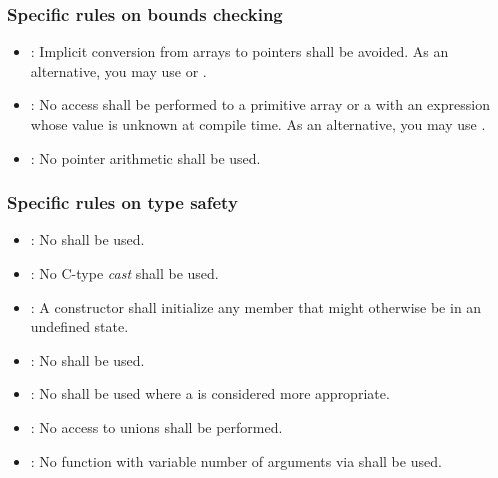 \subsubsection{Specific rules on bounds checking}

\begin{itemize}

\item {}:
Implicit conversion from arrays to pointers shall be avoided.
As an alternative, you may use
 or .

\item {}:
No access shall be performed to a primitive array or a 
with an expression whose value is unknown at compile time.
As an alternative, you may use 
.

\item {}:
No pointer arithmetic shall be used.

\end{itemize}

\subsubsection{Specific rules on type safety}

\begin{itemize}

\item {}:
No  shall be used.

\item {}:
No C-type \emph{cast} shall be used.

\item {}:
A constructor shall initialize any member that might otherwise be in an undefined state.

\item {}:
No  shall be used.

\item {}:
No  shall be used where
a  is considered more appropriate.

\item {}:
No access to unions shall be performed.

\item {}:
No function with variable number of arguments via
 shall be used.

\end{itemize}
